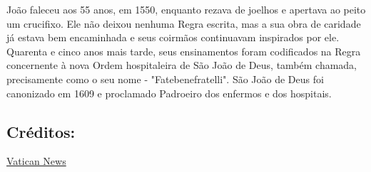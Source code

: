 \documentclass[18pt]{article}
\begin{document}
\begin{justify}
João faleceu aos 55 anos, em 1550, enquanto rezava de joelhos e apertava ao peito um crucifixo. Ele não deixou nenhuma Regra escrita, mas a sua obra de caridade já estava bem encaminhada e seus coirmãos continuavam inspirados por ele. Quarenta e cinco anos mais tarde, seus ensinamentos foram codificados na Regra concernente à nova Ordem hospitaleira de São João de Deus, também chamada, precisamente como o seu nome - "Fatebenefratelli".
São João de Deus foi canonizado em 1609 e proclamado Padroeiro dos enfermos e dos hospitais.

\begin{center}
 \subsection*{Créditos:}
 \href{https://www.vaticannews.va/pt/santo-do-dia/03/08/s--joao-de-deus--fundador-da-ordem-hospitaleira--padroeiro-dos-d.html}{Vatican News}
\end{center}


\end{justify}
\end{document}

